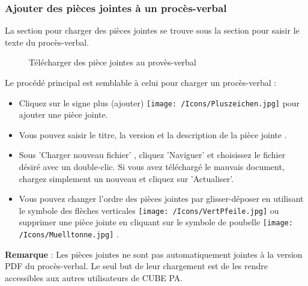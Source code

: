 \subsubsection{Ajouter des pièces jointes à un procès-verbal}

La section pour charger des pièces jointes se trouve sous la section pour saisir le texte du procès-verbal.

\begin{figure}[H]
\caption{Télécharger des pièce jointes au provès-verbal}
\end{figure}

Le procédé principal est semblable à celui pour charger un procès-verbal :

\begin{itemize}
\item
Cliquez sur le signe plus (ajouter) \texttt{[image: /Icons/Pluszeichen.jpg]}  pour ajouter une pièce jointe.
\item
Vous pouvez saisir le titre, la version et la description de la pièce jointe .
\item
Sous 'Charger nouveau fichier' , cliquez 'Naviguer' et choisissez le fichier désiré avec un double-clic. Si vous avez téléchargé le mauvais document, chargez simplement un nouveau et cliquez sur 'Actualiser'.
\item
Vous pouvez changer l'ordre des pièces jointes par glisser-déposer en utilisant le symbole des flèches verticales \texttt{[image: /Icons/VertPfeile.jpg]}  ou supprimer une pièce jointe en cliquant sur le symbole de poubelle \texttt{[image: /Icons/Muelltonne.jpg]} .
\end{itemize}

\vspace{\baselineskip}

\textbf{Remarque} : Les pièces jointes ne sont pas automatiquement jointes à la version PDF du procès-verbal. Le seul but de leur chargement est de les rendre accessibles aux autres utilisateurs de CUBE PA.

